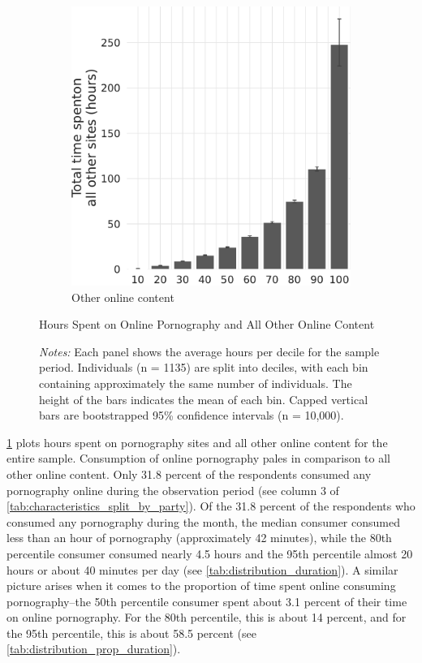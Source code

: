 \documentclass[12pt,twoside]{article}
\begin{document}
\begin{figure}[!ht]
\begin{subfigure}[b]{0.495\textwidth}
         \includegraphics[width=\textwidth]{figs/distribution_duration_on_nonadultsites_fullsample.pdf}
         \caption{Other online content}
     \end{subfigure}
\caption{Hours Spent on Online Pornography and All Other Online Content}
\label{fig:distribution_duration_on_adultsites_fullsample}
\caption*{\footnotesize \emph{Notes:} 
    Each panel shows the average hours per decile for the sample period.
    Individuals (n = 1135) are split into deciles, with each bin containing approximately the same number of individuals.
    The height of the bars indicates the mean of each bin. 
    Capped vertical bars are bootstrapped 95\% confidence intervals (n = 10,000).
}
\end{figure}

\cref{fig:distribution_duration_on_adultsites_fullsample} plots hours spent on pornography sites and all other online content for the entire sample. Consumption of online pornography pales in comparison to all other online content. Only 31.8 percent of the respondents consumed any pornography online during the observation period (see column 3 of \cref{tab:characteristics_split_by_party}). Of the 31.8 percent of the respondents who consumed any pornography during the month, the median consumer consumed less than an hour of pornography (approximately 42 minutes), while the 80th percentile consumer consumed nearly 4.5 hours and the 95th percentile almost 20 hours or about 40 minutes per day (see \cref{tab:distribution_duration}). A similar picture arises when it comes to the proportion of time spent online consuming pornography--the 50th percentile consumer spent about 3.1 percent of their time on online pornography. For the 80th percentile, this is about 14 percent, and for the 95th percentile, this is about 58.5 percent (see \cref{tab:distribution_prop_duration}).
\end{document}
